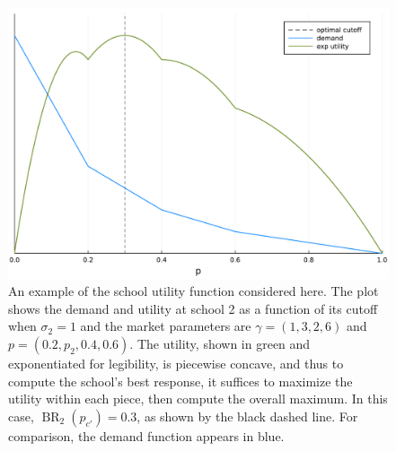 \documentclass[12pt]{article}
\numberwithin{equation}{subsection}
\theoremstyle{definition}
\begin{document}
\begin{figure}
\begin{center}\includegraphics[width=\linewidth, ]{singlescoreplots/cloud-function-example.pdf}\end{center}
\captionsetup{singlelinecheck=off}
    \caption[.]{An example of the school utility function considered here. The plot shows the demand and utility at school 2 as a function of its cutoff when $\sigma_2 = 1$ and the market parameters are $\gamma = (1, 3, 2, 6)$ and $p = (0.2, p_2, 0.4, 0.6)$. The utility, shown in green and exponentiated for legibility, is piecewise concave, and thus to compute the school's best response, it suffices to maximize the utility within each piece, then compute the overall maximum. In this case, $\operatorname{BR}_2(p_{c'}) = 0.3$, as shown by the black dashed line. For comparison, the demand function appears in blue.}
\label{cloud-function-example}
\end{figure}
\end{document}
